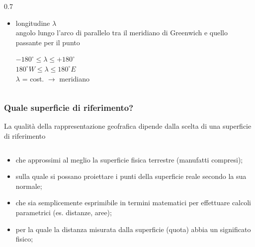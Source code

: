 \documentclass{beamer}
\begin{document}
{\begin{frame}
\begin{columns}
\begin{column} {0.7\textwidth}
\begin{itemize}
\begin{center}
             $ \varphi $ = cost.  $ \rightarrow $ parallelo
      		\end{center}
      		
      	    \item longitudine $\lambda$ \\
            {\scriptsize angolo lungo l'arco di parallelo tra il meridiano
            di Greenwich e quello passante per il punto}
          	\begin{center}
          		 $ -180^{\circ} \leq \lambda \leq +180^{\circ} $ \\
                 $ 180^{\circ} W \leq  \lambda \leq 180^{\circ} E $ \\
                 $ \lambda $ = cost.  $ \rightarrow $ meridiano
          		\end{center}
          	\end{itemize}
          
      \end{column}
  \end{columns}


\end{frame}

\begin{frame}
    \frametitle{Quale superficie di riferimento?}

    La qualità della rappresentazione geofrafica dipende dalla scelta di una
    superficie di riferimento

    \begin{columns}
        \begin{column}{0.7\textwidth}
        \begin{itemize}
            \item che approssimi al meglio la superficie fisica terrestre (manufatti compresi);
            \item sulla quale si possano proiettare i punti della superficie reale secondo la sua normale;
            \item che sia semplicemente esprimibile in termini matematici per effettuare
            calcoli parametrici (es. distanze, aree);
            \item per la quale la distanza misurata dalla superficie (quota) abbia un significato fisico; 
        \end{itemize}
            

\end{column}
\end{columns}
\end{frame}}
\end{document}
